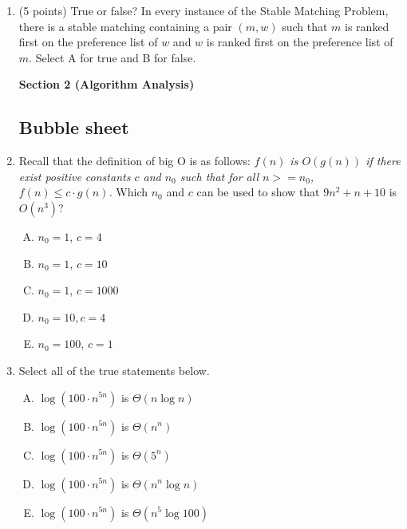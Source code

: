 \documentclass[11pt]{article}
\begin{document}
\begin{enumerate}
\begin{enumerate}[A.]
    \item $\{(h_1, s_1), (h_2, s_1), (h_3, s_2), (h_4, s_4)\}$
    \item $\{(h_1, s_1), (h_2, s_2), (h_3, s_3), (h_4, s_4)\}$
    \item $\{(h_1, s_4), (h_2, s_3), (h_3, s_1), (h_4, s_2)\}$
    \item $\{(h_1, s_2), (h_2, s_3), (h_3, s_1), (h_4, s_4)\}$
    \item $\{(h_1, s_3), (h_2, s_1), (h_3, s_4), (h_4, s_2)\}$
\end{enumerate}


\item (5 points) True or false? In every instance of the
 Stable Matching Problem, there is a stable matching containing a pair $(m,w)$
 such that $m$ is ranked first on the preference list of $w$ and $w$ is ranked
 first on the preference list of $m$. Select A for true and B for false.

\newpage


\begin{center}
\LARGE\textbf{Section 2 (Algorithm Analysis)\\}%
\end{center}

\subsection*{Bubble sheet}

\item Recall that the definition of big O is as follows:
\emph{$f(n)$ is $O(g(n))$ if there exist positive constants $c$ and $n_0$ such
that for all $n >= n_0$, $f(n) \leq c \cdot g(n)$.} Which $n_0$ and $c$ can be
used to show that $9n^2 + n + 10$ is $O(n^3)$?
\begin{enumerate}[A.]
    \item $n_0 = 1$, $c = 4$
    \item $n_0 = 1$, $c = 10$
    \item $n_0 = 1$, $c = 1000$
    \item $n_0=10, c = 4$
    \item $n_0 = 100$, $c = 1$

\end{enumerate}

\item Select all of the true statements below.
\begin{enumerate}[A.]
    \item $\log(100 \cdot n^{5n})$ is $\Theta(n \log n)$
    \item $\log(100 \cdot n^{5n})$ is $\Theta(n^n)$
    \item $\log(100 \cdot n^{5n})$ is $\Theta(5^n)$
    \item $\log(100 \cdot n^{5n})$ is $\Theta(n^n \log n)$
    \item $\log(100 \cdot n^{5n})$ is $\Theta(n^5 \log 100)$
\end{enumerate}


\end{enumerate}
\end{document}
